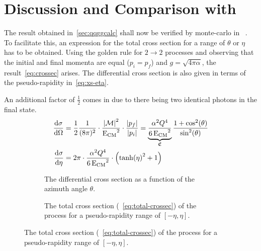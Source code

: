 
\section{Discussion and Comparison with \sherpa}%
\label{sec:compsher}

The result obtained in~\ref{sec:qqggcalc} shall now be verified by
monte-carlo in \sherpa{}~\cite{Gleisberg:2008ta}. To facilitate this, an
expression for the total cross section for a range of \(\theta\) or
\(\eta\) has to be obtained. Using the golden rule for
\(2\rightarrow 2\) processes and observing that the initial and final
momenta are equal (\(p_i=p_f\)) and \(g=\sqrt{4\pi\alpha}\), the
result~\eqref{eq:crossec} arises. The differential cross section is
also given in terms of the pseudo-rapidity in~\ref{eq:xs-eta}.

An additional factor of \(\frac{1}{2}\) comes in due to there being
two identical photons in the final state.
\begin{align}
  \dv{\sigma}{\Omega} &=
                        \frac{1}{2}\frac{1}{(8\pi)^2}\cdot\frac{\abs{\mathcal{M}}^2}{\operatorname{E_{\text{CM}}}^2}\cdot\frac{\abs{p_f}}{\abs{p_i}}
                        =
                        \underbrace{\frac{\alpha^2Q^4}{6\operatorname{E_{\text{CM}}}^2}}_{\mathfrak{C}}\frac{1+\cos^2(\theta)}{\sin^2(\theta)}\label{eq:crossec}
  \\
  \dv{\sigma}{\eta} &= 2\pi\cdot\frac{\alpha^2Q^4}{6\operatorname{E_{\text{CM}}}^2}\cdot\qty(\tanh(\eta)^2 + 1)\label{eq:xs-eta}
\end{align}

\begin{figure}[ht]
  \centering
  \begin{subfigure}[c]{.45\textwidth}
    \centering {}
    \caption[Plot of the differential cross section of the \(\qqgg\)
    process.]{\label{fig:diffxs} The differential cross section as a
      function of the azimuth angle \(\theta\). }
  \end{subfigure}
  \begin{subfigure}[c]{.45\textwidth}
  \centering
  \caption[Plot of the total cross section of the \(\qqgg\)
  process.]{\label{fig:totxs} The total cross section
    (~\ref{eq:total-crossec}) of the process for a pseudo-rapidity
    range of \([-\eta, \eta]\).}
  \end{subfigure}
\end{figure}

